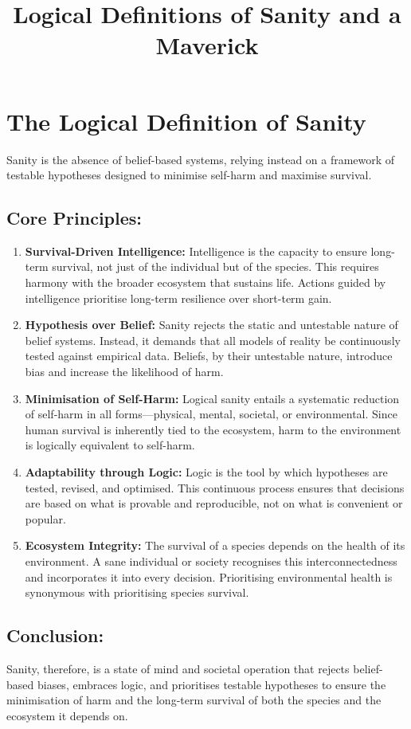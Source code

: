 \documentclass[12pt,a4paper]{article}
\title{Logical Definitions of Sanity and a Maverick}
\author{}
\date{}
\begin{document}
\maketitle

\section*{The Logical Definition of Sanity}
Sanity is the absence of belief-based systems, relying instead on a framework of testable hypotheses designed to minimise self-harm and maximise survival.

\subsection*{Core Principles:}
\begin{enumerate}
    \item \textbf{Survival-Driven Intelligence:} Intelligence is the capacity to ensure long-term survival, not just of the individual but of the species. This requires harmony with the broader ecosystem that sustains life. Actions guided by intelligence prioritise long-term resilience over short-term gain.
    \item \textbf{Hypothesis over Belief:} Sanity rejects the static and untestable nature of belief systems. Instead, it demands that all models of reality be continuously tested against empirical data. Beliefs, by their untestable nature, introduce bias and increase the likelihood of harm.
    \item \textbf{Minimisation of Self-Harm:} Logical sanity entails a systematic reduction of self-harm in all forms—physical, mental, societal, or environmental. Since human survival is inherently tied to the ecosystem, harm to the environment is logically equivalent to self-harm.
    \item \textbf{Adaptability through Logic:} Logic is the tool by which hypotheses are tested, revised, and optimised. This continuous process ensures that decisions are based on what is provable and reproducible, not on what is convenient or popular.
    \item \textbf{Ecosystem Integrity:} The survival of a species depends on the health of its environment. A sane individual or society recognises this interconnectedness and incorporates it into every decision. Prioritising environmental health is synonymous with prioritising species survival.
\end{enumerate}

\subsection*{Conclusion:}
Sanity, therefore, is a state of mind and societal operation that rejects belief-based biases, embraces logic, and prioritises testable hypotheses to ensure the minimisation of harm and the long-term survival of both the species and the ecosystem it depends on.
\end{document}
